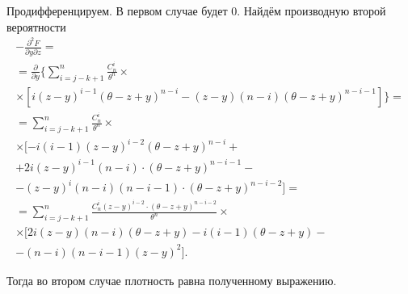 \begin{enumerate}[label=\alph*)]
Продифференцируем.
В первом случае будет 0.
Найдём производную второй вероятности
\begin{equation*}
  \begin{split}
    - \frac{ \partial^2 F}{ \partial y \partial z} = \\
    = \frac{ \partial }{ \partial y}
      \{
        \sum \limits_{i = j - k + 1}^n
          \frac{C_n^i}{ \theta^n} \times \\
          \times \left[
            i \left( z - y \right)^{i - 1} \left( \theta - z + y \right)^{n - i} -
            \left( z - y \right) \left( n - i \right) \left( \theta - z + y \right)^{n - i - 1}
          \right]
      \} = \\
    = \sum \limits_{i = j - k + 1}^n
      \frac{C_n^i}{ \theta^n} \times \\
      \times [
        -i \left( i - 1 \right) \left( z - y \right)^{i - 2} \left( \theta - z + y \right)^{n - i} + \\
        + 2i \left( z - y \right)^{i - 1} \left( n - i \right) \cdot
        \left( \theta - z + y \right)^{n - i - 1} - \\
        - \left( z - y \right)^i \left( n - i \right) \left( n - i - 1 \right) \cdot
        \left( \theta - z + y \right)^{n - i - 2}
      ] = \\
    = \sum \limits_{i = j - k + 1}^n
      \frac{C_n^i \left( z - y \right)^{i - 2} \cdot
      \left( \theta - z + y \right)^{n - i - 2}}{ \theta^n} \times \\
      \times [
        2i \left( z - y \right) \left( n - i \right) \left( \theta - z + y \right) -
        i \left( i - 1 \right) \left( \theta - z + y \right) - \\
        - \left( n - i \right) \left( n - i - 1 \right) \left( z - y \right)^2
      ].
  \end{split}
\end{equation*}

Тогда во втором случае плотность равна полученному выражению.

\end{enumerate}
